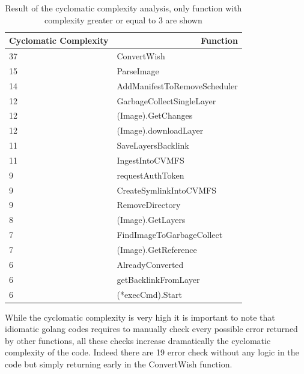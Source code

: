 \begin{table}[h]
\begin{tabular}{|l|l|}
\hline
\multicolumn{1}{|r|}{Cyclomatic Complexity} & \multicolumn{1}{r|}{Function} \\ \hline
37 & ConvertWish \\ \hline
15 & ParseImage \\ \hline
14 & AddManifestToRemoveScheduler \\ \hline
12 & GarbageCollectSingleLayer \\ \hline
12 & (Image).GetChanges \\ \hline
12 & (Image).downloadLayer \\ \hline
11 & SaveLayersBacklink \\ \hline
11 & IngestIntoCVMFS \\ \hline
9 & requestAuthToken \\ \hline
9 & CreateSymlinkIntoCVMFS \\ \hline
9 & RemoveDirectory \\ \hline
8 & (Image).GetLayers \\ \hline
7 & FindImageToGarbageCollect \\ \hline
7 & (Image).GetReference \\ \hline
6 & AlreadyConverted \\ \hline
6 & getBacklinkFromLayer \\ \hline
6 & (*execCmd).Start \\ \hline
\end{tabular}
\caption{Result of the cyclomatic complexity analysis, only function with complexity greater or equal to 3 are shown}
\label{tbl:cyclomatic}
\end{table}

While the cyclomatic complexity is very high it is important to note that
idiomatic golang codes requires to manually check every possible error returned
by other functions, all these checks increase dramatically the cyclomatic
complexity of the code. Indeed there are 19 error check without any logic in
the code but simply returning early in the ConvertWish function.


